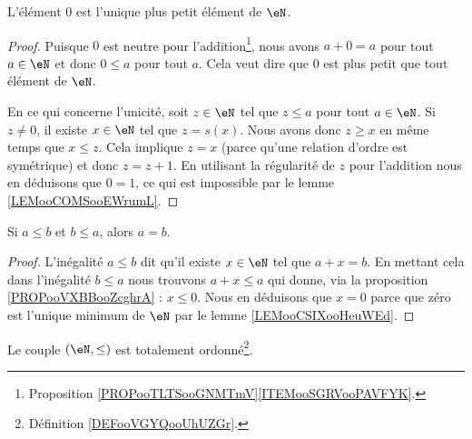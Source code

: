 \begin{lemma}       \label{LEMooCSIXooHeuWEd}
	L'élément \( 0\) est l'unique plus petit élément de \( \eN\).
\end{lemma}

\begin{proof}
	Puisque \( 0\) est neutre pour l'addition\footnote{Proposition \ref{PROPooTLTSooGNMTmV}\ref{ITEMooSGRVooPAVFYK}.}, nous avons \( a+0=a\) pour tout \( a\in \eN\) et donc \( 0\leq a\) pour tout \( a\). Cela veut dire que \( 0\) est plus petit que tout élément de \( \eN\).

	En ce qui concerne l'unicité, soit \( z\in \eN\) tel que \( z\leq a\) pour tout \( a\in \eN\). Si \( z\neq 0\), il existe \( x\in \eN\) tel que \( z=s(x)\). Nous avons donc \( z\geq x\) en même temps que \(x\leq z\). Cela implique \( z=x\) (parce qu'une relation d'ordre est symétrique) et donc \( z=z+1\). En utilisant la régularité de \( z\) pour l'addition nous en déduisons que \( 0=1\), ce qui est impossible par le lemme \ref{LEMooCOMSooEWrumL}.
\end{proof}

\begin{lemma}       \label{LEMooJRZKooOMhOkH}
	Si \( a\leq b\) et \( b\leq a\), alors \( a=b\).
\end{lemma}

\begin{proof}
	L'inégalité \( a\leq b\) dit qu'il existe \( x\in \eN\) tel que \( a+x=b\). En mettant cela dans l'inégalité \( b\leq a\) nous trouvons \( a+x\leq a\) qui donne, via la proposition \ref{PROPooVXBBooZcghrA} : \( x\leq 0\). Nous en déduisons que \( x=0\) parce que zéro est l'unique minimum de \( \eN\) par le lemme \ref{LEMooCSIXooHeuWEd}.
\end{proof}

\begin{proposition}     \label{PROPooGCCRooFBYrlo}
	Le couple \( (\eN,\leq)\) est totalement ordonné\footnote{Définition \ref{DEFooVGYQooUhUZGr}.}.
\end{proposition}

